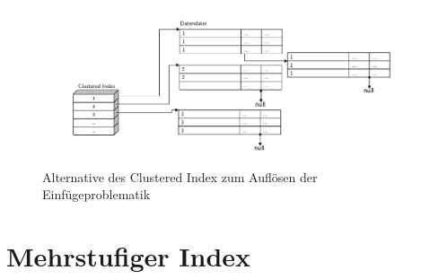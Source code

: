 {\begin{frame}{\insertsection}
	\begin{figure}
		\includegraphics[width=370pt]{img/ClusteredIndex2.pdf}
	\caption{Alternative des Clustered Index zum Auflösen der Einfügeproblematik}
	\end{figure}
\end{frame}
}

\section{Mehrstufiger Index}

